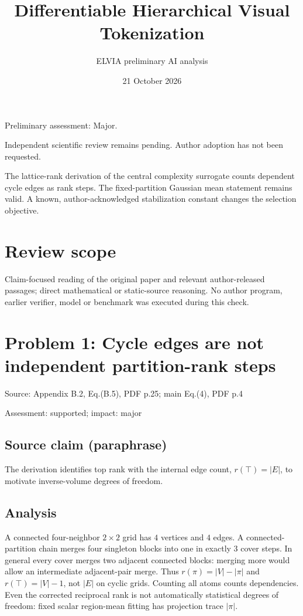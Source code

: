 \documentclass[11pt]{article}
\begin{document}
\title{Differentiable Hierarchical Visual Tokenization}

\author{ELVIA preliminary AI analysis}\date{21 October 2026}\maketitle

Preliminary assessment: Major.\par

Independent scientific review remains pending. Author adoption has not been requested.

The lattice-rank derivation of the central complexity surrogate counts dependent cycle edges as rank steps. The fixed-partition Gaussian mean statement remains valid. A known, author-acknowledged stabilization constant changes the selection objective.

\section*{Review scope}

Claim-focused reading of the original paper and relevant author-released passages; direct mathematical or static-source reasoning. No author program, earlier verifier, model or benchmark was executed during this check.

\section*{Problem 1: Cycle edges are not independent partition-rank steps}

Source: Appendix B.2, Eq.(B.5), PDF p.25; main Eq.(4), PDF p.4

Assessment: supported; impact: major

\subsection*{Source claim (paraphrase)}

The derivation identifies top rank with the internal edge count, \(r(\top)=|E|\), to motivate inverse-volume degrees of freedom.

\subsection*{Analysis}

A connected four-neighbor \(2\times2\) grid has \(4\) vertices and \(4\) edges. A connected-partition chain merges four singleton blocks into one in exactly \(3\) cover steps. In general every cover merges two adjacent connected blocks: merging more would allow an intermediate adjacent-pair merge. Thus \(r(\pi)=|V|-|\pi|\) and \(r(\top)=|V|-1\), not \(|E|\) on cyclic grids. Counting all atoms counts dependencies. Even the corrected reciprocal rank is not automatically statistical degrees of freedom: fixed scalar region-mean fitting has projection trace \(|\pi|\).
\end{document}
